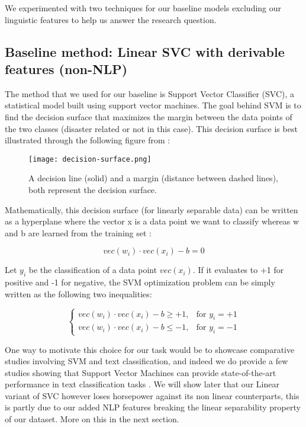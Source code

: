 We experimented with two techniques for our baseline models excluding our linguistic features to help us answer the research question.

\subsection{Baseline method: Linear SVC with derivable features (non-NLP)}
The method that we used for our baseline is Support Vector Classifier (SVC), a statistical model built using support vector machines.
The goal behind SVM is to find the decision surface that maximizes the margin between the data points of the two classes (disaster related or not in this case).
This decision surface is best illustrated through the following figure from \cite{4}:

\begin{figure}[h]
  \centering
  \texttt{[image: decision-surface.png]}
  \caption{A decision line (solid) and a margin (distance between dashed lines), both represent the decision surface.}
  \label{fig:decision-surface}
\end{figure}

Mathematically, this decision surface (for linearly separable data) can be written as a hyperplane \cite{4} where the vector x is a data point we want to classify whereas w and b are learned from the training set :

$$vec(w_i) \cdot vec(x_i) - b = 0$$

Let $y_i$ be the classification of a data point $vec(x_i)$. If it evaluates to +1 for positive and -1 for negative, the SVM optimization problem can be simply written as the following two inequalities:

$$
\begin{cases}
  vec(w_i) \cdot vec(x_i) - b \geq +1, &\text{for } y_i = +1 \\
  vec(w_i) \cdot vec(x_i) -b \leq -1, &\text{for } y_i = -1
\end{cases}
$$


One way to motivate this choice for our task would be to showcase comparative studies involving SVM and text classification, and indeed we do provide a few studies showing that Support Vector Machines can provide state-of-the-art performance in text classification tasks \cite{3,4}.
We will show later that our Linear variant of SVC however loses horsepower against its non linear counterparts, this is partly due to our added NLP features breaking the linear separability property of our dataset.
More on this in the next section.

